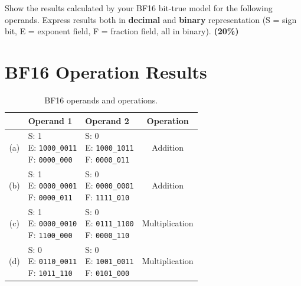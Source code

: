 \documentclass[12pt,a4paper]{report}
\begin{document}
Show the results calculated by your BF16 bit-true model for the following operands.
Express results both in \textbf{decimal} and \textbf{binary} representation
(S = sign bit, E = exponent field, F = fraction field, all in binary).
\textbf{(20\%)}

\section{BF16 Operation Results}

\begin{table}[H]
    \centering
    \renewcommand{\arraystretch}{1.3}
    \begin{tabular}{cllc}
        \toprule
        & \textbf{Operand 1} & \textbf{Operand 2} & \textbf{Operation} \\
        \midrule
        (a) &
        \makecell[l]{S: 1 \\ E: \texttt{1000\_0011} \\ F: \texttt{0000\_000}} &
        \makecell[l]{S: 0 \\ E: \texttt{1000\_1011} \\ F: \texttt{0000\_011}} &
        Addition \\
        \midrule
        (b) &
        \makecell[l]{S: 1 \\ E: \texttt{0000\_0001} \\ F: \texttt{0000\_011}} &
        \makecell[l]{S: 0 \\ E: \texttt{0000\_0001} \\ F: \texttt{1111\_010}} &
        Addition \\
        \midrule
        (c) &
        \makecell[l]{S: 1 \\ E: \texttt{0000\_0010} \\ F: \texttt{1100\_000}} &
        \makecell[l]{S: 0 \\ E: \texttt{0111\_1100} \\ F: \texttt{0000\_110}} &
        Multiplication \\
        \midrule
        (d) &
        \makecell[l]{S: 0 \\ E: \texttt{0110\_0011} \\ F: \texttt{1011\_110}} &
        \makecell[l]{S: 0 \\ E: \texttt{1001\_0011} \\ F: \texttt{0101\_000}} &
        Multiplication \\
        \bottomrule
    \end{tabular}
    \caption{BF16 operands and operations.}
    \label{tab:bf16-ops}
\end{table}
\end{document}
